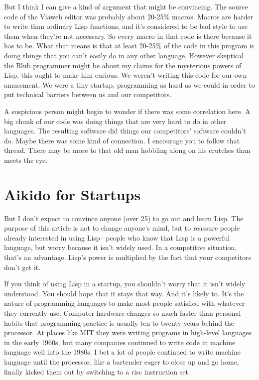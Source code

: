 \documentclass[10pt,twoside,openright]{memoir}
\begin{document}
But I think I can give a kind of argument that might be convincing. The source code of the Viaweb editor was probably about 20-25\% macros. Macros are harder to write than ordinary Lisp functions, and it's considered to be bad style to use them when they're not necessary. So every macro in that code is there because it has to be. What that means is that at least 20-25\% of the code in this program is doing things that you can't easily do in any other language. However skeptical the Blub programmer might be about my claims for the mysterious powers of Lisp, this ought to make him curious. We weren't writing this code for our own amusement. We were a tiny startup, programming as hard as we could in order to put technical barriers between us and our competitors.

A suspicious person might begin to wonder if there was some correlation here. A big chunk of our code was doing things that are very hard to do in other languages. The resulting software did things our competitors' software couldn't do. Maybe there was some kind of connection. I encourage you to follow that thread. There may be more to that old man hobbling along on his crutches than meets the eye.

\section{Aikido for Startups}

But I don't expect to convince anyone (over 25) to go out and learn Lisp. The purpose of this article is not to change anyone's mind, but to reassure people already interested in using Lisp-- people who know that Lisp is a powerful language, but worry because it isn't widely used. In a competitive situation, that's an advantage. Lisp's power is multiplied by the fact that your competitors don't get it.

If you think of using Lisp in a startup, you shouldn't worry that it isn't widely understood. You should hope that it stays that way. And it's likely to. It's the nature of programming languages to make most people satisfied with whatever they currently use. Computer hardware changes so much faster than personal habits that programming practice is usually ten to twenty years behind the processor. At places like MIT they were writing programs in high-level languages in the early 1960s, but many companies continued to write code in machine language well into the 1980s. I bet a lot of people continued to write machine language until the processor, like a bartender eager to close up and go home, finally kicked them out by switching to a risc instruction set.
\end{document}
